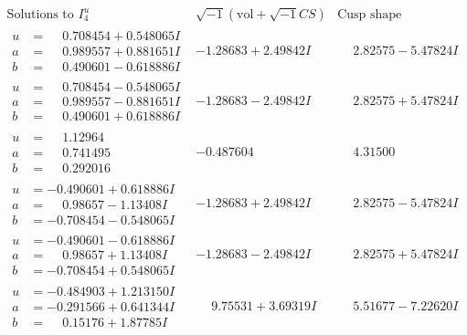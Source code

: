 \documentclass[1p]{elsarticle_modified}
\theoremstyle{definition}
\newcommand{\I}{\sqrt{-1}}
\begin{document}
$$\begin{array}{c|c|c}  
\text{Solutions to }I^u_{4}& \I (\text{vol} + \sqrt{-1}CS) & \text{Cusp shape}\\
 \hline 
\begin{aligned}
u &= \phantom{-}0.708454 + 0.548065 I \\
a &= \phantom{-}0.989557 + 0.881651 I \\
b &= \phantom{-}0.490601 - 0.618886 I\end{aligned}
 & -1.28683 + 2.49842 I & \phantom{-}2.82575 - 5.47824 I \\ \hline\begin{aligned}
u &= \phantom{-}0.708454 - 0.548065 I \\
a &= \phantom{-}0.989557 - 0.881651 I \\
b &= \phantom{-}0.490601 + 0.618886 I\end{aligned}
 & -1.28683 - 2.49842 I & \phantom{-}2.82575 + 5.47824 I \\ \hline\begin{aligned}
u &= \phantom{-}1.12964\phantom{ +0.000000I} \\
a &= \phantom{-}0.741495\phantom{ +0.000000I} \\
b &= \phantom{-}0.292016\phantom{ +0.000000I}\end{aligned}
 & -0.487604\phantom{ +0.000000I} & \phantom{-}4.31500\phantom{ +0.000000I} \\ \hline\begin{aligned}
u &= -0.490601 + 0.618886 I \\
a &= \phantom{-}0.98657 - 1.13408 I \\
b &= -0.708454 - 0.548065 I\end{aligned}
 & -1.28683 + 2.49842 I & \phantom{-}2.82575 - 5.47824 I \\ \hline\begin{aligned}
u &= -0.490601 - 0.618886 I \\
a &= \phantom{-}0.98657 + 1.13408 I \\
b &= -0.708454 + 0.548065 I\end{aligned}
 & -1.28683 - 2.49842 I & \phantom{-}2.82575 + 5.47824 I \\ \hline\begin{aligned}
u &= -0.484903 + 1.213150 I \\
a &= -0.291566 + 0.641344 I \\
b &= \phantom{-}0.15176 + 1.87785 I\end{aligned}
 & \phantom{-}9.75531 + 3.69319 I & \phantom{-}5.51677 - 7.22620 I \\ \hline\begin{aligned}

\end{aligned}
\end{array}$$
\end{document}
